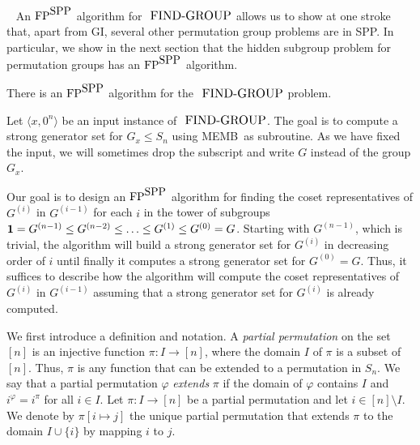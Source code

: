 \documentclass{elsart}
\newenvironment{remark}{\begin{trivlist}%
\item[\hskip\labelsep{\bf Remark.}]~}{\end{trivlist}}
\newcommand{\FP}{\mbox{\rm FP}}
\newcommand{\SPP}{\mbox{\rm SPP}}
\newcommand{\FINDGROUP}{\mbox{\small\rm FIND{-}GROUP}}
\newcommand{\MEMB}{{\rm{MEMB}}}
\renewcommand{\angle}[1]{\langle #1\rangle}
\begin{document}
\begin{remark}
  An $\FP^{\SPP}$ algorithm for $\FINDGROUP$ allows us to show at one
  stroke that, apart from GI, several other permutation group problems
  are in SPP. In particular, we show in the next section that the
  hidden subgroup problem for permutation groups has an $\FP^{\SPP}$
  algorithm.
\end{remark}

\begin{thm}\label{maintheorem}
  There is an $\FP^{\SPP}$ algorithm for the $\FINDGROUP$ problem.
\end{thm}

\begin{pf} 
  Let $\angle{x,0^n}$ be an input instance of $\FINDGROUP$. The goal
  is to compute a strong generator set for $G_x\leq S_n$ using \MEMB\ 
  as subroutine. As we have fixed the input, we will sometimes drop
  the subscript and write $G$ instead of the group $G_x$.
  
  Our goal is to design an $\FP^{\SPP}$ algorithm for finding the
  coset representatives of $G^{(i)}$ in $G^{(i-1)}$ for each $i$ in the
  tower of subgroups ${\bf 1}=G^{(n-1)}\leq G^{(n-2)}\leq\ldots\leq
  G^{(1)}\leq G^{(0)}=G$. Starting with $G^{(n-1)}$, which is trivial, the
  algorithm will build a strong generator set for $G^{(i)}$ in decreasing
  order of $i$ until finally it computes a strong generator set for
  $G^{(0)}=G$. Thus, it suffices to describe how the algorithm will
  compute the coset representatives of $G^{(i)}$ in $G^{(i-1)}$ assuming
  that a strong generator set for $G^{(i)}$ is already computed.

  We first introduce a definition and notation. A \emph{partial
    permutation} on the set $[n]$ is an injective function $\pi:
  I\longrightarrow [n]$, where the domain $I$ of $\pi$ is a subset of
  $[n]$. Thus, $\pi$ is any function that can be extended to a
  permutation in $S_n$. We say that a partial permutation $\varphi$
  \emph{extends} $\pi$ if the domain of $\varphi$ contains $I$ and
  $i^\varphi=i^\pi$ for all $i\in I$. Let $\pi:I\longrightarrow [n]$
  be a partial permutation and let $i\in[n]\setminus I$. We denote by
  $\pi[i\mapsto j]$ the unique partial permutation that extends $\pi$
  to the domain $I \cup\{i\}$ by mapping $i$ to $j$.


\end{pf}
\end{document}
